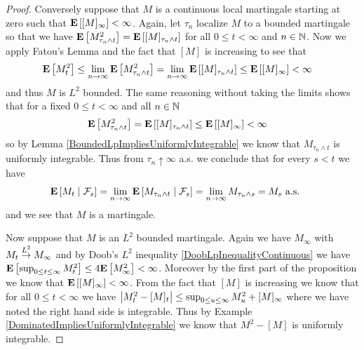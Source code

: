 \begin{proof}
Conversely suppose that $M$ is a continuous local martingale starting at zero such that $\expectation{[M]_\infty} < \infty$.  Again, let $\tau_n$ localize $M$ to a bounded martingale so that we have $\expectation{M^2_{\tau_n \wedge t}} = \expectation{[M]_{\tau_n \wedge t}}$ for all $0 \leq t < \infty$ and $n \in \naturals$.  Now we apply Fatou's Lemma and the fact that $[M]$ is increasing to see that
\begin{align*}
\expectation{M^2_{t}} &\leq \lim_{n \to \infty} \expectation{M^2_{\tau_n \wedge t}} = 
\lim_{n \to \infty} \expectation{[M]_{\tau_n \wedge t}} \leq \expectation{[M]_{\infty}} < \infty
\end{align*}
and thus $M$ is $L^2$ bounded.  The same reasoning without taking the limits shows that for a fixed $0 \leq t < \infty$ and all $n \in \naturals$
\begin{align*}
\expectation{M^2_{\tau_n \wedge t}} &= \expectation{[M]_{\tau_n \wedge t}} \leq
\expectation{[M]_{\infty}} < \infty
\end{align*}
so by Lemma \ref{BoundedLpImpliesUniformlyIntegrable} we know that $M_{\tau_n \wedge t}$ is uniformly integrable.  Thus from $\tau_n \uparrow \infty$ a.s. we conclude that for every $s < t$ we have
\begin{align*}
\cexpectationlong{\mathcal{F}_s}{M_t} &= 
\lim_{n \to \infty}\cexpectationlong{\mathcal{F}_s}{M_{\tau_n \wedge t}} = 
\lim_{n \to \infty} M_{\tau_n \wedge s} = M_s \text{ a.s. }
\end{align*}
and we see that $M$ is a martingale.

Now suppose that $M$ is an $L^2$ bounded martingale.  Again we have $M_\infty$ with $M_t \tolp{2} M_\infty$ and by  Doob's $L^2$ inequality \ref{DoobLpInequalityContinuous} we have $\expectation{\sup_{0 \leq t \leq \infty} M^2_t} \leq 4 \expectation{M_\infty^2} < \infty$.  Moreover by the first part of the proposition we know that $\expectation{[M]_\infty} < \infty$.    From the fact that $[M]$ is increasing we know that for all $0 \leq t < \infty$ we have $\abs{M^2_{t} - [M]_{t}} \leq \sup_{0 \leq u \leq \infty} M^2_u + [M]_\infty$ where we have noted the right hand side is integrable. Thus by Example \ref{DominatedImpliesUniformlyIntegrable} we know that $M^2 - [M]$ is uniformly integrable.


\end{proof}
